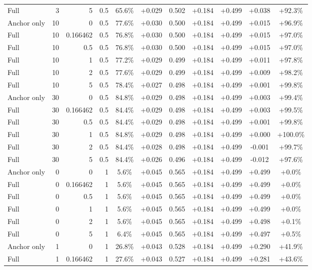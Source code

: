\begin{table}[htbp]
\begin{tabular}{lrrrccccccc}
Full & 3 & 5 & 0.5 & 65.6\% & +0.029 & 0.502 & +0.184 & +0.499 & +0.038 & +92.3\% \\
Anchor only & 10 & 0 & 0.5 & 77.6\% & +0.030 & 0.500 & +0.184 & +0.499 & +0.015 & +96.9\% \\
Full & 10 & 0.166462 & 0.5 & 76.8\% & +0.030 & 0.500 & +0.184 & +0.499 & +0.015 & +97.0\% \\
Full & 10 & 0.5 & 0.5 & 76.8\% & +0.030 & 0.500 & +0.184 & +0.499 & +0.015 & +97.0\% \\
Full & 10 & 1 & 0.5 & 77.2\% & +0.029 & 0.499 & +0.184 & +0.499 & +0.011 & +97.8\% \\
Full & 10 & 2 & 0.5 & 77.6\% & +0.029 & 0.499 & +0.184 & +0.499 & +0.009 & +98.2\% \\
Full & 10 & 5 & 0.5 & 78.4\% & +0.027 & 0.498 & +0.184 & +0.499 & +0.001 & +99.8\% \\
Anchor only & 30 & 0 & 0.5 & 84.8\% & +0.029 & 0.498 & +0.184 & +0.499 & +0.003 & +99.4\% \\
Full & 30 & 0.166462 & 0.5 & 84.4\% & +0.029 & 0.498 & +0.184 & +0.499 & +0.003 & +99.5\% \\
Full & 30 & 0.5 & 0.5 & 84.4\% & +0.029 & 0.498 & +0.184 & +0.499 & +0.001 & +99.8\% \\
Full & 30 & 1 & 0.5 & 84.8\% & +0.029 & 0.498 & +0.184 & +0.499 & +0.000 & +100.0\% \\
Full & 30 & 2 & 0.5 & 84.4\% & +0.028 & 0.498 & +0.184 & +0.499 & -0.001 & +99.7\% \\
Full & 30 & 5 & 0.5 & 84.4\% & +0.026 & 0.496 & +0.184 & +0.499 & -0.012 & +97.6\% \\
Anchor only & 0 & 0 & 1 & 5.6\% & +0.045 & 0.565 & +0.184 & +0.499 & +0.499 & +0.0\% \\
Full & 0 & 0.166462 & 1 & 5.6\% & +0.045 & 0.565 & +0.184 & +0.499 & +0.499 & +0.0\% \\
Full & 0 & 0.5 & 1 & 5.6\% & +0.045 & 0.565 & +0.184 & +0.499 & +0.499 & +0.0\% \\
Full & 0 & 1 & 1 & 5.6\% & +0.045 & 0.565 & +0.184 & +0.499 & +0.499 & +0.0\% \\
Full & 0 & 2 & 1 & 5.6\% & +0.045 & 0.565 & +0.184 & +0.499 & +0.498 & +0.1\% \\
Full & 0 & 5 & 1 & 6.4\% & +0.045 & 0.565 & +0.184 & +0.499 & +0.497 & +0.5\% \\
Anchor only & 1 & 0 & 1 & 26.8\% & +0.043 & 0.528 & +0.184 & +0.499 & +0.290 & +41.9\% \\
Full & 1 & 0.166462 & 1 & 27.6\% & +0.043 & 0.527 & +0.184 & +0.499 & +0.281 & +43.6\% \\

\end{tabular}
\end{table}
